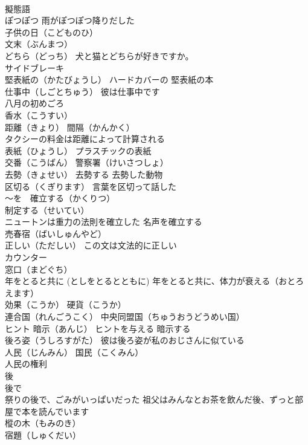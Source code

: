 \documentclass[8pt]{extreport}
\begin{document}
\begin{CJK}{UTF8}{min}
\\	擬態語 
\\	ぽつぽつ 雨がぽつぽつ降りだした
\\	子供の日（こどものひ）
\\	文末（ぶんまつ）
\\	どちら（どっち） 犬と猫とどちらが好きですか。
\\	サイドブレーキ
\\	堅表紙の（かたびょうし） ハードカバーの 堅表紙の本
\\	仕事中（しごとちゅう） 彼は仕事中です
\\	八月の初めごろ
\\	香水（こうすい）
\\	距離（きょり） 間隔（かんかく）
\\	タクシーの料金は距離によって計算される
\\	表紙（ひょうし） プラスチックの表紙
\\	交番（こうばん） 警察署（けいさつしょ）
\\	去勢（きょせい） 去勢する 去勢した動物
\\	区切る（くぎります） 言葉を区切って話した
\\	～を　確立する（かくりつ）
\\	制定する（せいてい）
\\	ニュートンは重力の法則を確立した 名声を確立する
\\	売春宿（ばいしゅんやど）
\\	正しい（ただしい） この文は文法的に正しい
\\	カウンター 
\\	窓口（まどぐち）
\\	年をとると共に (としをとるとともに) 年をとると共に、体力が衰える（おとろえます）
\\	効果（こうか） 硬貨（こうか）
\\	連合国（れんごうこく） 中央同盟国（ちゅうおうどうめい国）
\\	ヒント 暗示（あんじ） ヒントを与える 暗示する
\\	後ろ姿（うしろすがた） 彼は後ろ姿が私のおじさんに似ている
\\	人民（じんみん） 国民（こくみん）
\\	人民の権利
\\	後 
\\	後で 
\\	祭りの後で、ごみがいっぱいだった 祖父はみんなとお茶を飲んだ後、ずっと部屋で本を読んでいます
\\	樅の木（もみのき）
\\	宿題（しゅくだい）

\end{CJK}
\end{document}

